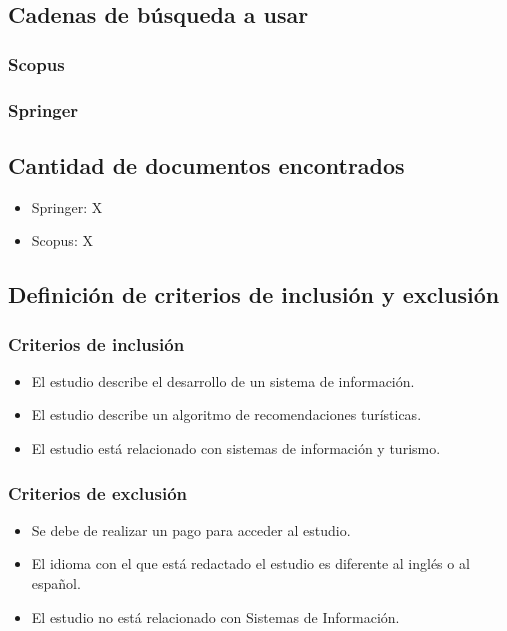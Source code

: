 \documentclass{report}
\begin{document}
\subsection{Cadenas de búsqueda a usar}

\subsubsection{Scopus}

\subsubsection{Springer}

\subsection{Cantidad de documentos encontrados}

\begin{itemize}
    \item{Springer: X}
    \item{Scopus: X}
\end{itemize}

\subsection{Definición de criterios de inclusión y exclusión}

\subsubsection{Criterios de inclusión}

\begin{itemize}
    \item{El estudio describe el desarrollo de un sistema de información.}
    \item{El estudio describe un algoritmo de recomendaciones turísticas.}
    \item{El estudio está relacionado con sistemas de información y turismo.}
\end{itemize}

\subsubsection{Criterios de exclusión}

\begin{itemize}
    \item{Se debe de realizar un pago para acceder al estudio.}
    \item{El idioma con el que está redactado el estudio es diferente al inglés
        o al español.}
    \item{El estudio no está relacionado con Sistemas de Información.}
\end{itemize}
\end{document}
